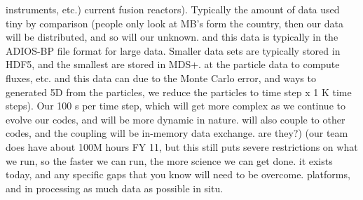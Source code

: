 \documentclass[times]{cpeauth}
\begin{document}
%
instruments, etc.)
%
current fusion reactors). Typically the amount of data used %
tiny by comparison (people only look at MB's form %
%
%
the country, then our data will be distributed, and so will our
unknown.
%
%
and this data is typically in the ADIOS-BP file format for large data. Smaller
data sets are typically stored in HDF5, and the smallest are stored in MDS+.
%
%
%
at the particle data to compute fluxes, etc. and this data can %
due to the Monte Carlo error, and ways to generated 5D %
from the particles, we reduce the particles to %
time step x 1 K time steps). Our %
100 s per time step, which %
%
%
will get more complex as we continue to evolve our codes, and will be more
dynamic in nature.
%
%
will also couple to other codes, and the coupling will be in-memory data
exchange.
%
are they?)
%
(our team does have about 100M hours FY 11, but this still puts severe
restrictions on what we run, so the faster we can run, the more science we can
get done.
%
it exists today, and any specific gaps that you know will need to be overcome.
%
platforms, and in processing as much data as possible in situ.
\end{document}
